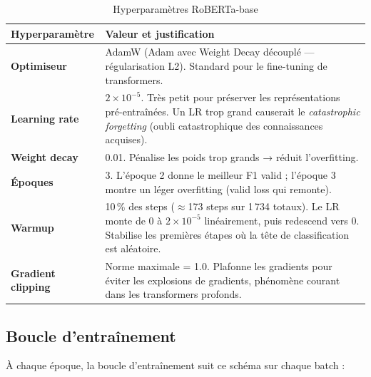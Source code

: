 \documentclass[12pt, a4paper]{article}
\begin{document}
\begin{table}[H]
  \centering
  \begin{tabular}{lp{9cm}}
    \toprule
    \textbf{Hyperparamètre} & \textbf{Valeur et justification} \\
    \midrule
    \textbf{Optimiseur} & AdamW (Adam avec Weight Decay découplé — régularisation L2).
      Standard pour le fine-tuning de transformers. \\
    \textbf{Learning rate} & $2 \times 10^{-5}$.
      Très petit pour préserver les représentations pré-entraînées.
      Un LR trop grand causerait le \textit{catastrophic forgetting}
      (oubli catastrophique des connaissances acquises). \\
    \textbf{Weight decay} & 0.01. Pénalise les poids trop grands → réduit l'overfitting. \\
    \textbf{Époques} & 3. L'époque 2 donne le meilleur F1 valid ;
      l'époque 3 montre un léger overfitting (valid loss qui remonte). \\
    \textbf{Warmup} & 10\,\% des steps ($\approx$173 steps sur 1\,734 totaux).
      Le LR monte de 0 à $2 \times 10^{-5}$ linéairement, puis redescend vers 0.
      Stabilise les premières étapes où la tête de classification est aléatoire. \\
    \textbf{Gradient clipping} & Norme maximale = 1.0.
      Plafonne les gradients pour éviter les explosions de gradients,
      phénomène courant dans les transformers profonds. \\
    \bottomrule
  \end{tabular}
  \caption{Hyperparamètres RoBERTa-base}
\end{table}

\subsection{Boucle d'entraînement}

À chaque époque, la boucle d'entraînement suit ce schéma sur chaque batch :
\end{document}
